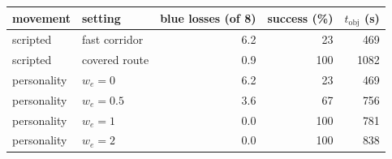 \begin{tabular}{llrrr}
\toprule
movement & setting & blue losses (of 8) & success (\%) & $t_{\text{obj}}$ (s) \\
\midrule
scripted & fast corridor & 6.2 & 23 & 469 \\
scripted & covered route & 0.9 & 100 & 1082 \\
\midrule
personality & $w_e{=}0$ & 6.2 & 23 & 469 \\
personality & $w_e{=}0.5$ & 3.6 & 67 & 756 \\
personality & $w_e{=}1$ & 0.0 & 100 & 781 \\
personality & $w_e{=}2$ & 0.0 & 100 & 838 \\
\bottomrule
\end{tabular}
